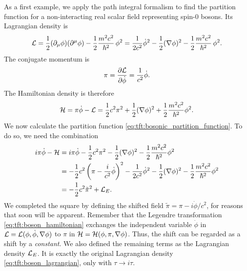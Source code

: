 As a first example, we apply the path integral formalism to find the partition function for a non-interacting real scalar field representing spin-$0$ bosons.
Its Lagrangian density is
\begin{equation}
	\mathcal{L} = \frac{1}{2} (\partial_\mu \phi) (\partial^\mu \phi) - \frac12 \frac{m^2 c^2}{\hbar^2} \, \phi^2
	      = \frac{1}{2 c^2} \dot{\phi}^2 - \frac12 (\nabla \phi)^2  - \frac12 \frac{m^2 c^2}{\hbar^2} \, \phi^2 .
\label{eq:tft:boson_lagrangian}
\end{equation}
The conjugate momentum  is
\begin{equation}
	\pi = \pdv{\mathcal{L}}{\dot{\phi}} = \frac{1}{c^2} \dot{\phi} .
\end{equation}
The Hamiltonian density is therefore
\begin{equation}
	\mathcal{H} = \pi \dot{\phi} - \mathcal{L} = \frac12 c^2 \pi^2 + \frac12 (\nabla \phi)^2 + \frac12 \frac{m^2 c^2}{\hbar^2} \phi^2 .
\label{eq:tft:boson_hamiltonian}
\end{equation}
We now calculate the partition function \eqref{eq:tft:bosonic_partition_function}.
To do so, we need the combination
\begin{equation}
\begin{split}
	i \pi \dot\phi - \mathcal{H} &= i \pi \dot\phi - \frac{1}{2} c^2 \pi^2 - \frac12 (\nabla \phi)^2 - \frac{1}{2} \frac{m^2 c^2}{\hbar^2} \phi^2 \\
	                      &= -\frac{1}{2} c^2 \left( \pi - \frac{i}{c^2} \dot\phi \right)^2 - \frac{1}{2 c^2} \dot\phi^2 - \frac{1}{2} (\nabla \phi)^2 - \frac{1}{2} \frac{m^2 c^2}{\hbar^2} \phi^2 \\
	                      &= -\frac{1}{2} c^2 \tilde\pi^2 + \mathcal{L}_E . \\
\end{split}
\label{eq:tft:boson_field_combination}
\end{equation}
We completed the square by defining the shifted field $\tilde\pi = \pi - i \dot\phi / c^2$, for reasons that soon will be apparent.
Remember that the Legendre transformation \eqref{eq:tft:boson_hamiltonian} exchanges the independent variable $\dot\phi$ in $\mathcal{L} = \mathcal{L}(\phi, \dot\phi, \nabla\phi)$ to $\pi$ in $\mathcal{H} = \mathcal{H}(\phi, \pi, \nabla\phi)$.
Thus, the shift can be regarded as a shift by a \emph{constant}.
We also defined the remaining terms as the Lagrangian density $\mathcal{L}_E$.
It is exactly the original Lagrangian density \eqref{eq:tft:boson_lagrangian}, only with $\tau \rightarrow i \tau$.
